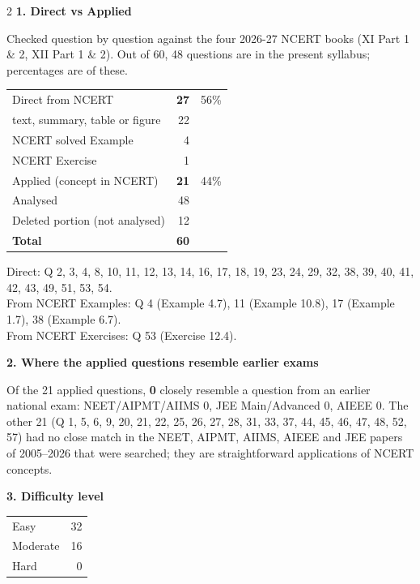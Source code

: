 \vspace{4pt}
\begin{multicols}{2}
\textbf{\color{crimson}1. Direct vs Applied}\par\smallskip
{\footnotesize Checked question by question against the four 2026-27 NCERT books (XI Part 1 \& 2, XII Part 1 \& 2). Out of 60, 48 questions are in the present syllabus; percentages are of these.}\par\smallskip
\begin{tabular}{@{}lrr@{}}\toprule
Direct from NCERT & \textbf{27} & 56\%\\
\quad text, summary, table or figure & 22 &\\
\quad NCERT solved Example & 4 &\\
\quad NCERT Exercise & 1 &\\
Applied (concept in NCERT) & \textbf{21} & 44\%\\\midrule
Analysed & 48 &\\
Deleted portion (not analysed) & 12 &\\\midrule
\textbf{Total} & \textbf{60} &\\\bottomrule\end{tabular}\par\smallskip
{\footnotesize Direct: Q 2, 3, 4, 8, 10, 11, 12, 13, 14, 16, 17, 18, 19, 23, 24, 29, 32, 38, 39, 40, 41, 42, 43, 49, 51, 53, 54.\\ From NCERT Examples: Q 4 (Example 4.7), 11 (Example 10.8), 17 (Example 1.7), 38 (Example 6.7).\\ From NCERT Exercises: Q 53 (Exercise 12.4).}\par\medskip
\textbf{\color{crimson}2. Where the applied questions resemble earlier exams}\par\smallskip
Of the 21 applied questions, \textbf{0} closely resemble a question from an earlier national exam:
NEET/AIPMT/AIIMS 0, JEE Main/Advanced 0, AIEEE 0. The other 21 (Q 1, 5, 6, 9, 20, 21, 22, 25, 26, 27, 28, 31, 33, 37, 44, 45, 46, 47, 48, 52, 57) had no close match in the NEET, AIPMT, AIIMS, AIEEE and JEE papers of 2005--2026 that were searched; they are straightforward applications of NCERT concepts.\par
\medskip
\textbf{\color{crimson}3. Difficulty level}\par\smallskip
\begin{tabular}{@{}lr@{}}\toprule
Easy & 32\\ Moderate & 16\\ Hard & 0\\\bottomrule\end{tabular}\par\smallskip

\end{multicols}
